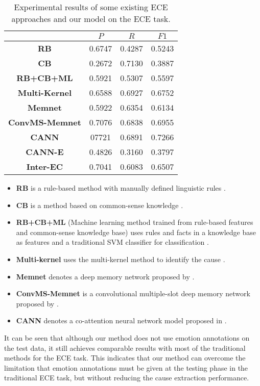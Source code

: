 \documentclass[11pt,a4paper]{article}
\begin{document}
\begin{table}
	\small
	\centering
	\begin{tabular} {c|c|c|c}
		\hline
		 & $P$ & $R$ & $F1$\\
		\hline
		\textbf{RB} & 0.6747 & 0.4287 & 0.5243\\
		\textbf{CB} & 0.2672 & 0.7130 & 0.3887\\
		\textbf{RB+CB+ML} & 0.5921 & 0.5307 & 0.5597\\
		\textbf{Multi-Kernel} & 0.6588 & 0.6927 & 0.6752\\
		\textbf{Memnet} & 0.5922 & 0.6354 & 0.6134\\
		\textbf{ConvMS-Memnet} & 0.7076 & 0.6838 & 0.6955\\
		\textbf{CANN} & 07721 & 0.6891 & 0.7266\\
		\hline
		\textbf{CANN-E} & 0.4826 & 0.3160 & 0.3797\\
		\textbf{Inter-EC} & 0.7041 & 0.6083 & 0.6507\\
		\hline
	\end{tabular}
	\caption{Experimental results of some existing ECE approaches and our model on the ECE task.}
	\label{TableFive}
\end{table}
\begin{itemize}
	\item \textbf{RB} is a rule-based method with manually defined linguistic rules \cite{lee2010text}.
	\item \textbf{CB} is a method based on common-sense knowledge \cite{russo2011emocause}.
	\item \textbf{RB+CB+ML} (Machine learning method trained from rule-based features and common-sense knowledge base) uses rules and facts in a knowledge base as features and a traditional SVM classifier for classification \cite{chen2010emotion}.
	\item \textbf{Multi-kernel} uses the multi-kernel method to identify the cause \cite{gui2016event}.
	\item \textbf{Memnet} denotes a deep memory network proposed by \citet{gui2017question}.
	\item \textbf{ConvMS-Memnet} is a convolutional multiple-slot deep memory network proposed by \citet{gui2017question}.
	\item \textbf{CANN} denotes a co-attention neural network model proposed in \citet{li2018co}.
\end{itemize}

It can be seen that although our method does not use emotion annotations on the test data, it still achieves comparable results with most of the traditional methods for the ECE task. This indicates that our method can overcome the limitation that emotion annotations must be given at the testing phase in the traditional ECE task, but without reducing the cause extraction performance.
\end{document}
